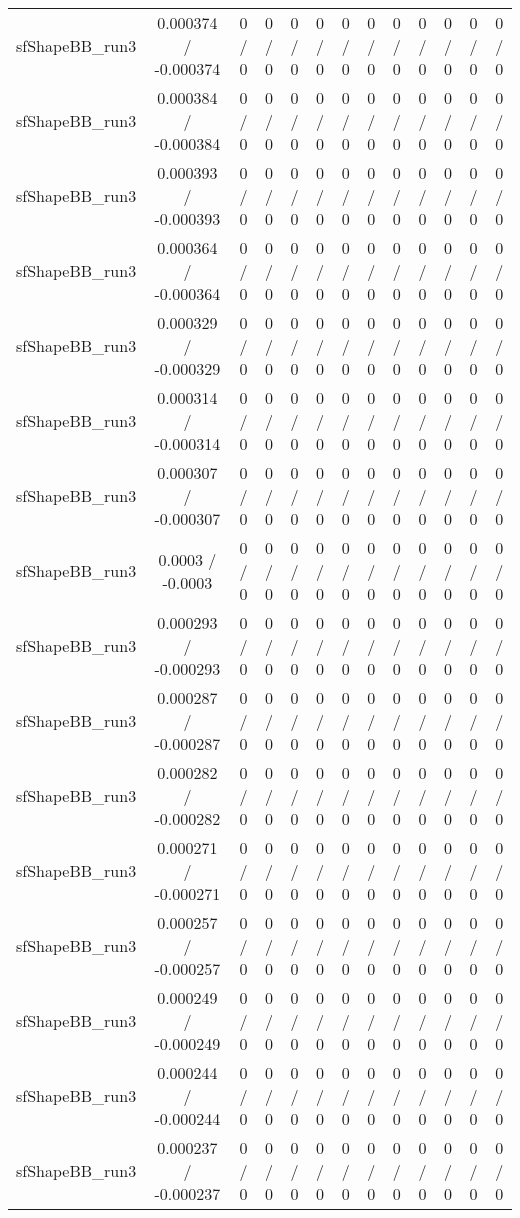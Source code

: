 \documentclass[10pt]{article}
\begin{document}
\begin{table}[htbp]
\begin{center}
\begin{tabular}{|c|c|c|c|c|c|c|c|c|c|c|c|c|}
  sfShapeBB_run3 & 0.000374 / -0.000374 & 0 / 0 & 0 / 0 & 0 / 0 & 0 / 0 & 0 / 0 & 0 / 0 & 0 / 0 & 0 / 0 & 0 / 0 & 0 / 0 & 0 / 0 \\ 
  sfShapeBB_run3 & 0.000384 / -0.000384 & 0 / 0 & 0 / 0 & 0 / 0 & 0 / 0 & 0 / 0 & 0 / 0 & 0 / 0 & 0 / 0 & 0 / 0 & 0 / 0 & 0 / 0 \\ 
  sfShapeBB_run3 & 0.000393 / -0.000393 & 0 / 0 & 0 / 0 & 0 / 0 & 0 / 0 & 0 / 0 & 0 / 0 & 0 / 0 & 0 / 0 & 0 / 0 & 0 / 0 & 0 / 0 \\ 
  sfShapeBB_run3 & 0.000364 / -0.000364 & 0 / 0 & 0 / 0 & 0 / 0 & 0 / 0 & 0 / 0 & 0 / 0 & 0 / 0 & 0 / 0 & 0 / 0 & 0 / 0 & 0 / 0 \\ 
  sfShapeBB_run3 & 0.000329 / -0.000329 & 0 / 0 & 0 / 0 & 0 / 0 & 0 / 0 & 0 / 0 & 0 / 0 & 0 / 0 & 0 / 0 & 0 / 0 & 0 / 0 & 0 / 0 \\ 
  sfShapeBB_run3 & 0.000314 / -0.000314 & 0 / 0 & 0 / 0 & 0 / 0 & 0 / 0 & 0 / 0 & 0 / 0 & 0 / 0 & 0 / 0 & 0 / 0 & 0 / 0 & 0 / 0 \\ 
  sfShapeBB_run3 & 0.000307 / -0.000307 & 0 / 0 & 0 / 0 & 0 / 0 & 0 / 0 & 0 / 0 & 0 / 0 & 0 / 0 & 0 / 0 & 0 / 0 & 0 / 0 & 0 / 0 \\ 
  sfShapeBB_run3 & 0.0003 / -0.0003 & 0 / 0 & 0 / 0 & 0 / 0 & 0 / 0 & 0 / 0 & 0 / 0 & 0 / 0 & 0 / 0 & 0 / 0 & 0 / 0 & 0 / 0 \\ 
  sfShapeBB_run3 & 0.000293 / -0.000293 & 0 / 0 & 0 / 0 & 0 / 0 & 0 / 0 & 0 / 0 & 0 / 0 & 0 / 0 & 0 / 0 & 0 / 0 & 0 / 0 & 0 / 0 \\ 
  sfShapeBB_run3 & 0.000287 / -0.000287 & 0 / 0 & 0 / 0 & 0 / 0 & 0 / 0 & 0 / 0 & 0 / 0 & 0 / 0 & 0 / 0 & 0 / 0 & 0 / 0 & 0 / 0 \\ 
  sfShapeBB_run3 & 0.000282 / -0.000282 & 0 / 0 & 0 / 0 & 0 / 0 & 0 / 0 & 0 / 0 & 0 / 0 & 0 / 0 & 0 / 0 & 0 / 0 & 0 / 0 & 0 / 0 \\ 
  sfShapeBB_run3 & 0.000271 / -0.000271 & 0 / 0 & 0 / 0 & 0 / 0 & 0 / 0 & 0 / 0 & 0 / 0 & 0 / 0 & 0 / 0 & 0 / 0 & 0 / 0 & 0 / 0 \\ 
  sfShapeBB_run3 & 0.000257 / -0.000257 & 0 / 0 & 0 / 0 & 0 / 0 & 0 / 0 & 0 / 0 & 0 / 0 & 0 / 0 & 0 / 0 & 0 / 0 & 0 / 0 & 0 / 0 \\ 
  sfShapeBB_run3 & 0.000249 / -0.000249 & 0 / 0 & 0 / 0 & 0 / 0 & 0 / 0 & 0 / 0 & 0 / 0 & 0 / 0 & 0 / 0 & 0 / 0 & 0 / 0 & 0 / 0 \\ 
  sfShapeBB_run3 & 0.000244 / -0.000244 & 0 / 0 & 0 / 0 & 0 / 0 & 0 / 0 & 0 / 0 & 0 / 0 & 0 / 0 & 0 / 0 & 0 / 0 & 0 / 0 & 0 / 0 \\ 
  sfShapeBB_run3 & 0.000237 / -0.000237 & 0 / 0 & 0 / 0 & 0 / 0 & 0 / 0 & 0 / 0 & 0 / 0 & 0 / 0 & 0 / 0 & 0 / 0 & 0 / 0 & 0 / 0 \\ 

\end{tabular}
\end{center}
\end{table}
\end{document}
